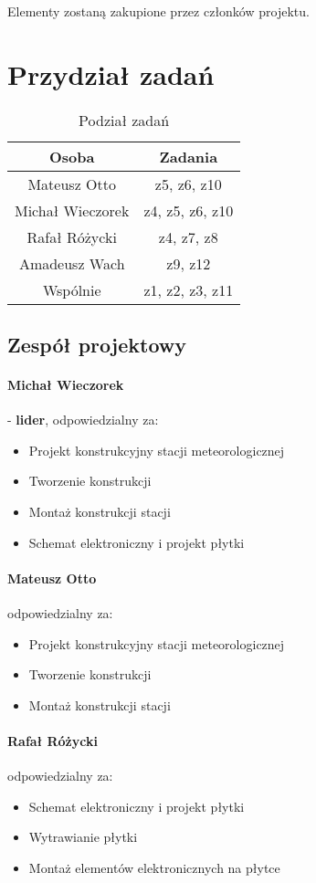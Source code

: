 \documentclass[12pt]{article}
\begin{document}
Elementy zostaną zakupione przez członków projektu.

\section{Przydział zadań}
\begin{table}[!ht]
\centering
\begin{tabular}{|c|c|}
\hline 
Osoba  & Zadania \\ 
\hline 
Mateusz Otto & z5, z6, z10 \\ 
\hline 
Michał Wieczorek & z4, z5, z6, z10 \\ 
\hline 
Rafał Różycki & z4, z7, z8  \\ 
\hline 
Amadeusz Wach & z9, z12 \\ 
\hline 
Wspólnie & z1, z2, z3, z11 \\
\hline
\end{tabular} 
\caption{Podział zadań}
\end{table}

\subsection{Zespół projektowy}
\paragraph{Michał Wieczorek} - \textbf{lider}, odpowiedzialny za:
\begin{itemize}
\item Projekt konstrukcyjny stacji meteorologicznej
\item Tworzenie konstrukcji
\item Montaż konstrukcji stacji
\item Schemat elektroniczny i projekt płytki
\end{itemize}
\paragraph{Mateusz Otto} odpowiedzialny za: 
\begin{itemize}
\item Projekt konstrukcyjny stacji meteorologicznej
\item Tworzenie konstrukcji
\item Montaż konstrukcji stacji
\end{itemize}
\paragraph{Rafał Różycki} odpowiedzialny za: 
\begin{itemize}
\item Schemat elektroniczny i projekt płytki
\item Wytrawianie płytki
\item Montaż elementów elektronicznych na płytce
\end{itemize}
\end{document}
